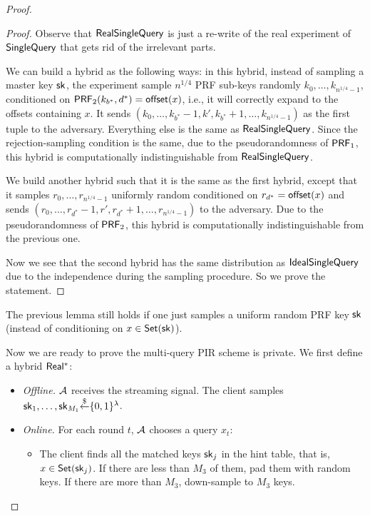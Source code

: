 \begin{proof}
\begin{lemma}
\begin{itemize}
        \end{itemize}
        
        
    \end{lemma}
    
    \begin{proof}
        Observe that ${\sf RealSingleQuery}$ is just a re-write of the real experiment of $\mathsf{SingleQuery}$ that gets rid of the irrelevant parts.
        
        We can build a hybrid as the following ways: in this hybrid, instead of sampling a master key $\mathsf{sk}$, the experiment sample $n^{1/4}$ PRF sub-keys randomly $k_0,\dots,k_{n^{1/4}-1}$, conditioned on $\mathsf{PRF}_2(k_{b^*}, d^*)=\mathsf{offset}(x)$, i.e., it will correctly expand to the offsets containing $x$. It sends $(k_0,\dots,k_{b^*}-1,k',k_{b^*}+1,\dots,k_{n^{1/4}-1})$ as the first tuple to the adversary. Everything else is the same as ${\sf RealSingleQuery}$. Since the rejection-sampling condition is the same, due to the pseudorandomness of $\mathsf{PRF}_1$, this hybrid is computationally indistinguishable from ${\sf RealSingleQuery}$. 
        
        We build another hybrid such that it is the same as the first hybrid, except that it samples $r_0,\dots,r_{n^{1/4}-1}$ uniformly random conditioned on $r_{d^*}=\mathsf{offset}(x)$ and sends $(r_0,\dots,r_{d^*}-1,r',r_{d^*}+1,\dots,r_{n^{1/4}-1})$ to the adversary.
        Due to the pseudorandomness of  $\mathsf{PRF}_2$, this hybrid is computationally indistinguishable from the previous one.
        
        Now we see that the second hybrid has the same distribution as ${\sf IdealSingleQuery}$ due to the independence during the sampling procedure.
        So we prove the statement.
    \end{proof}
    
    \begin{remark}
        \label{lem:privacy-random}
        The previous lemma still holds if one just samples a uniform random PRF key $\mathsf{sk}$ (instead of conditioning on $x\in\mathsf{Set}(\mathsf{sk})$).
    \end{remark}
    
    Now we are ready to prove the multi-query PIR scheme is private. We first define a hybrid ${\sf Real^*}$:
    
    
    \begin{itemize}
        \item \textit{Offline.} $\mathcal{A}$ receives the streaming signal. The client samples $\mathsf{sk}_1,\dots,\mathsf{sk}_{M_1}{\overset{\$}{\leftarrow}}\{0,1\}^\lambda$.  
        \item \textit{Online.} For each round $t$, $\mathcal{A}$ chooses a query $x_t$:
        \begin{itemize}
            \item The client finds all the matched keys $\mathsf{sk}_j$ in the hint table, that is, $x\in\mathsf{Set}(\mathsf{sk}_j)$. If there are less than $M_3$ of them, pad them with random keys. If there are more than $M_3$, down-sample to $M_3$ keys.


\end{itemize}
\end{itemize}
\end{proof}
